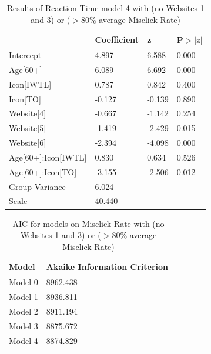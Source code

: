 \documentclass[12pt,twoside]{reedthesis}
\begin{document}
\begin{table}[h!]
        \centering
        \begin{tabular}{| p{5cm} | p{2.5cm} | p{2.5cm} | p{2.5cm} |}
            \hline
            & Coefficient & z & P$>|\text{z}|$\\
            \hline
            Intercept & 4.897 & 6.588 & 0.000\\
            \hline
            Age[60+] & 6.089 & 6.692 & 0.000\\
            \hline
            Icon[IWTL] & 0.787 & 0.842 & 0.400\\
            \hline
            Icon[TO] & -0.127 & -0.139 & 0.890\\
            \hline
            Website[4] & -0.667 & -1.142 & 0.254\\
            \hline
            Website[5] & -1.419 & -2.429 & 0.015\\
            \hline
            Website[6] & -2.394 & -4.098 & 0.000\\
            \hline
            Age[60+]:Icon[IWTL] & 0.830 & 0.634 & 0.526\\
            \hline
            Age[60+]:Icon[TO] & -3.155 & -2.506 & 0.012\\
            \hline
            Group Variance & 6.024 &&\\
            \hline
            Scale & 40.440 &&\\
            \hline
        \end{tabular}
        \caption{Results of Reaction Time model 4 with (no Websites 1 and 3) or ($>80$\% average Misclick Rate)}
    \end{table}

\begin{table}[h!]
        \centering
        \begin{tabular}{| p{3.5cm} | p{7.5cm} |}
            \hline
            Model & Akaike Information Criterion\\
            \hline
            Model 0 & 8962.438\\
            \hline
            Model 1 & 8936.811\\
            \hline
            Model 2 & 8911.194\\
            \hline
            Model 3 & 8875.672\\
            \hline
            Model 4 & 8874.829\\
            \hline
        \end{tabular}
        \caption{AIC for models on Misclick Rate with (no Websites 1 and 3) or ($>80$\% average Misclick Rate)}
    \end{table}
\end{document}
